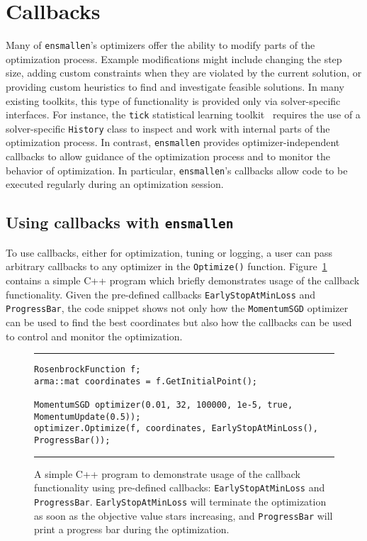 \section{Callbacks}
\label{sec:callbacks}

Many of {\tt ensmallen}'s optimizers offer the ability to modify parts of the
optimization process.  Example modifications might include changing the step
size, adding custom constraints when they are violated by the current solution,
or providing custom heuristics to find and investigate feasible solutions.  In
many existing toolkits, this type of functionality is provided only via
solver-specific interfaces.  For instance, the {\tt tick} statistical learning
toolkit~\cite{bacry2017tick} requires the use of a solver-specific {\tt History}
class to inspect and work with internal parts of the optimization process.  In
contrast, {\tt ensmallen} provides optimizer-independent callbacks to allow
guidance of the optimization process and to monitor the behavior of
optimization.  In particular, {\tt ensmallen}'s callbacks allow code to be
executed regularly during an optimization session.

\subsection{Using callbacks with {\tt ensmallen}}

To use callbacks, either for optimization, tuning or logging, a user can pass
arbitrary callbacks to any optimizer in the {\tt Optimize()} function.
Figure~\ref{fig:example_prog_callbacks} contains a simple C++ program which
briefly demonstrates usage of the callback functionality.  Given the pre-defined
callbacks {\tt EarlyStopAtMinLoss} and {\tt ProgressBar}, the code snippet shows
not only how the {\tt MomentumSGD} optimizer can be used to find the best
coordinates but also how the callbacks can be used to control and monitor the
optimization.

\begin{figure}[t!]
\centering
\hrule
\vspace{1ex}
\begin{verbatim}
RosenbrockFunction f;
arma::mat coordinates = f.GetInitialPoint();

MomentumSGD optimizer(0.01, 32, 100000, 1e-5, true, MomentumUpdate(0.5));
optimizer.Optimize(f, coordinates, EarlyStopAtMinLoss(), ProgressBar());
\end{verbatim}
\hrule
\vspace*{-0.5em}
\caption
  {
  A simple C++ program to demonstrate usage of the callback functionality using
pre-defined callbacks: \texttt{EarlyStopAtMinLoss} and \texttt{ProgressBar}.
{\tt EarlyStopAtMinLoss} will terminate the optimization as soon as the
objective value stars increasing, and {\tt ProgressBar} will print a progress
bar during the optimization.
  }
\label{fig:example_prog_callbacks}
\end{figure}

